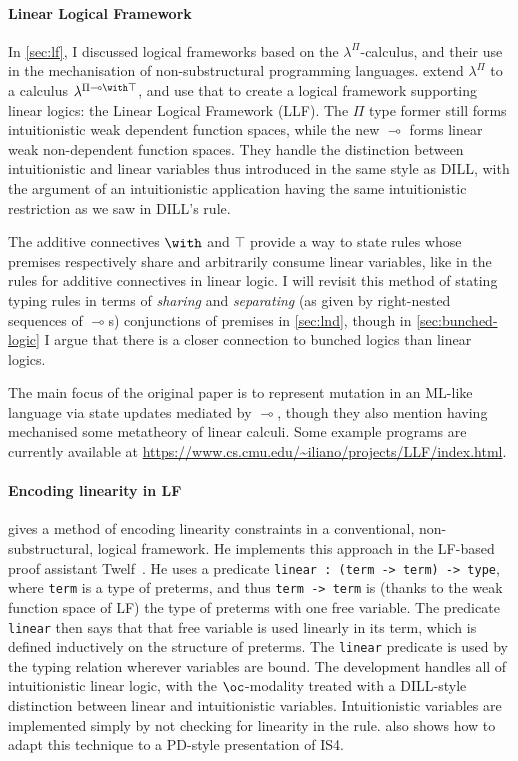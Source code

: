 \paragraph{Linear Logical Framework}
In \cref{sec:lf}, I discussed logical frameworks based on the
$\lambda^\Pi$-calculus, and their use in the mechanisation of non-substructural
programming languages.
 extend $\lambda^\Pi$ to a calculus
$\lambda^{\Pi\multimap\with\top}$, and use that to create a logical framework
supporting linear logics: the Linear Logical Framework (LLF).
The $\Pi$ type former still forms intuitionistic weak dependent function spaces,
while the new $\multimap$ forms linear weak non-dependent function spaces.
They handle the distinction between intuitionistic and linear variables thus
introduced in the same style as DILL, with the argument of an intuitionistic
application having the same intuitionistic restriction as we saw in DILL's
 rule.

The additive connectives $\with$ and $\top$ provide a way to state rules whose
premises respectively share and arbitrarily consume linear variables, like in
the rules for additive connectives in linear logic.
I will revisit this method of stating typing rules in terms of \emph{sharing}
and \emph{separating} (as given by right-nested sequences of $\multimap$s)
conjunctions of premises in \cref{sec:lnd}, though in \cref{sec:bunched-logic}
I argue that there is a closer connection to bunched logics than linear logics.

The main focus of the original paper is to represent mutation in an ML-like
language via state updates mediated by $\multimap$, though they also mention
having mechanised some metatheory of linear calculi.
Some example programs are currently available at
\url{https://www.cs.cmu.edu/~iliano/projects/LLF/index.html}.

\paragraph{Encoding linearity in LF}
 gives a method of encoding linearity constraints in a
conventional, non-substructural, logical framework.
He implements this approach in the LF-based proof assistant Twelf~\citep{Twelf}.
He uses a predicate \texttt{linear : (term -> term) -> type}, where
\texttt{term} is a type of preterms, and thus \texttt{term -> term} is (thanks
to the weak function space of LF) the type of preterms with one free variable.
The predicate \texttt{linear} then says that that free variable is used linearly
in its term, which is defined inductively on the structure of preterms.
The \texttt{linear} predicate is used by the typing relation wherever variables
are bound.
The development handles all of intuitionistic linear logic, with the
$\oc$-modality treated with a DILL-style distinction between linear and
intuitionistic variables.
Intuitionistic variables are implemented simply by not checking for linearity in
the  rule.
 also shows how to adapt this technique to a PD-style
presentation of IS4.

